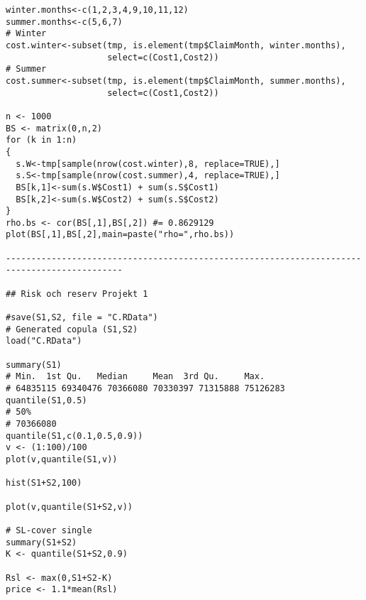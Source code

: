 \documentclass[11pt]{article}
\begin{document}
\begin{verbatim}
winter.months<-c(1,2,3,4,9,10,11,12)
summer.months<-c(5,6,7)
# Winter
cost.winter<-subset(tmp, is.element(tmp$ClaimMonth, winter.months), 
                    select=c(Cost1,Cost2))
# Summer
cost.summer<-subset(tmp, is.element(tmp$ClaimMonth, summer.months), 
                    select=c(Cost1,Cost2))

n <- 1000
BS <- matrix(0,n,2)
for (k in 1:n)
{
  s.W<-tmp[sample(nrow(cost.winter),8, replace=TRUE),]
  s.S<-tmp[sample(nrow(cost.summer),4, replace=TRUE),]
  BS[k,1]<-sum(s.W$Cost1) + sum(s.S$Cost1)
  BS[k,2]<-sum(s.W$Cost2) + sum(s.S$Cost2)
}
rho.bs <- cor(BS[,1],BS[,2]) #= 0.8629129
plot(BS[,1],BS[,2],main=paste("rho=",rho.bs))

---------------------------------------------------------------------------------------------

## Risk och reserv Projekt 1

#save(S1,S2, file = "C.RData")
# Generated copula (S1,S2)
load("C.RData")

summary(S1)
# Min.  1st Qu.   Median     Mean  3rd Qu.     Max. 
# 64835115 69340476 70366080 70330397 71315888 75126283 
quantile(S1,0.5)
# 50% 
# 70366080
quantile(S1,c(0.1,0.5,0.9))
v <- (1:100)/100
plot(v,quantile(S1,v))

hist(S1+S2,100)

plot(v,quantile(S1+S2,v))

# SL-cover single
summary(S1+S2)
K <- quantile(S1+S2,0.9)

Rsl <- max(0,S1+S2-K)
price <- 1.1*mean(Rsl)





\end{verbatim}
\end{document}
